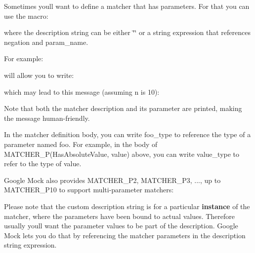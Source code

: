 Sometimes you\textquotesingle{}ll want to define a matcher that has parameters. For that you can use the macro\+: 
\begin{DoxyCode}{0}
\end{DoxyCode}
 where the description string can be either {\ttfamily \char`\"{}\char`\"{}} or a string expression that references {\ttfamily negation} and {\ttfamily param\+\_\+name}.

For example\+: 
\begin{DoxyCode}{0}
\end{DoxyCode}
 will allow you to write\+: 
\begin{DoxyCode}{0}
\end{DoxyCode}
 which may lead to this message (assuming {\ttfamily n} is 10)\+: 
\begin{DoxyCode}{0}
\end{DoxyCode}


Note that both the matcher description and its parameter are printed, making the message human-\/friendly.

In the matcher definition body, you can write {\ttfamily foo\+\_\+type} to reference the type of a parameter named {\ttfamily foo}. For example, in the body of {\ttfamily M\+A\+T\+C\+H\+E\+R\+\_\+\+P(\+Has\+Absolute\+Value, value)} above, you can write {\ttfamily value\+\_\+type} to refer to the type of {\ttfamily value}.

Google Mock also provides {\ttfamily M\+A\+T\+C\+H\+E\+R\+\_\+\+P2}, {\ttfamily M\+A\+T\+C\+H\+E\+R\+\_\+\+P3}, ..., up to {\ttfamily M\+A\+T\+C\+H\+E\+R\+\_\+\+P10} to support multi-\/parameter matchers\+: 
\begin{DoxyCode}{0}
\end{DoxyCode}


Please note that the custom description string is for a particular {\bfseries instance} of the matcher, where the parameters have been bound to actual values. Therefore usually you\textquotesingle{}ll want the parameter values to be part of the description. Google Mock lets you do that by referencing the matcher parameters in the description string expression.

